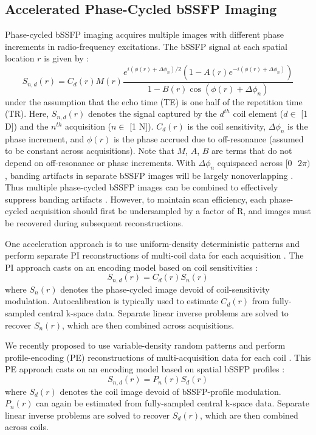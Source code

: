 \documentclass[11pt, onecolumn]{article}
\begin{document}
\subsection*{Accelerated Phase-Cycled bSSFP Imaging}
Phase-cycled bSSFP imaging acquires multiple images with different phase increments in radio-frequency excitations. The bSSFP signal at each spatial location $r$ is given by \cite{Bjork:2014hm}:
\begin{equation}
\label{eq:sind}
S_{n,d}(r)={C_d(r)}{M(r)}\frac{{{e^{i\left( {\phi(r)  + \Delta {\phi _n}} \right)/2}} \left( {1 - A(r){e^{ - i\left( {\phi(r)  + \Delta {\phi _n}} \right)}}} \right)}}{{1 - B(r)\cos (\phi(r)  + \Delta {\phi _n})}}
\end{equation}
under the assumption that the echo time (TE) is one half of the repetition time (TR). Here, $S_{n,d}(r)$ denotes the signal captured by the $d^{th}$ coil element ($d \in$ [1 D]) and the $n^{th}$ acquisition ($n \in$ [1 N]). $C_d(r)$ is the coil sensitivity, $\Delta \phi_n$ is the phase increment, and $\phi (r)$ is the phase accrued due to off-resonance (assumed to be constant across acquisitions). Note that $M$, $A$, $B$ are terms that do not depend on off-resonance or phase increments. With $\Delta \phi_n$ equispaced across $[0 \mbox{ }2\pi) $, banding artifacts in separate bSSFP images will be largely nonoverlapping \cite{Scheffler:2003cu}. Thus multiple phase-cycled bSSFP images can be combined to effectively suppress banding artifacts \cite{Bangerter04,Cukur:2007dx}. However, to maintain scan efficiency, each phase-cycled acquisition should first be undersampled by a factor of R, and images must be recovered during subsequent reconstructions. 

One acceleration approach is to use uniform-density deterministic patterns and perform separate PI reconstructions of multi-coil data for each acquisition \cite{Wang:2015hh}. The PI approach casts on  an encoding model based on coil sensitivities \cite{PruessmannSENSE}:  
\begin{equation}
{S_{n,d}}(r)={C_d}(r){S_n}(r)
\end{equation}
where $S_n (r)$ denotes the phase-cycled image devoid of coil-sensitivity modulation. Autocalibration is typically used to estimate $C_d (r)$ from fully-sampled central k-space data. Separate linear inverse problems are solved to recover $S_n (r)$, which are then combined across acquisitions.

We recently proposed to use variable-density random patterns and perform profile-encoding (PE) reconstructions of multi-acquisition data for each coil \cite{Ilicak:FJpKoYYb}. This PE approach casts on  an encoding model based on spatial bSSFP profiles \cite{mikisFOV,Cukur:2008ht}:
\begin{equation}
{S_{n,d}}(r)={P_n}(r){S_d}(r)
\end{equation}
where $S_d (r)$ denotes the coil image devoid of bSSFP-profile modulation. $P_n (r)$ can again be estimated from fully-sampled central k-space data. Separate linear inverse problems are solved to recover $S_d (r)$, which are then combined across coils.
\end{document}
